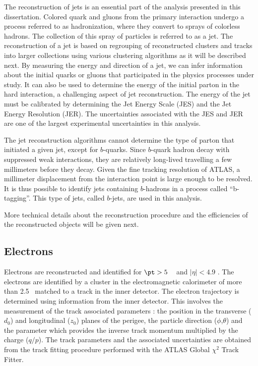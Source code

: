The reconstruction of jets is an essential part of the analysis presented in this dissertation. 
Colored quark and gluons from the primary interaction  undergo a process referred to as hadronization,
where they convert to sprays of colorless hadrons. The collection of this spray of particles is 
referred to as a jet. 
The reconstruction of a jet is based on regrouping of reconstructed clusters and tracks into larger collections using
various clustering algorithms as it will be described next.
By measuring the energy and direction of a jet, we can infer information 
about the initial quarks or gluons that participated in the physics processes under study.
It can also be used to determine the energy of the initial parton in the hard interaction, 
a challenging aspect of jet reconstruction.
The energy of the jet must be calibrated by determining the 
Jet Energy Scale (JES) and the Jet Energy Resolution (JER).%
The uncertainties associated with the JES and JER are one of the largest 
experimental uncertainties in this analysis.

The jet reconstruction algorithms cannot determine the type of parton that initiated a
given jet, except for $b$-quarks.
Since $b$-quark hadron decay with suppressed weak interactions, they are 
relatively long-lived travelling a few millimeters before they decay.
Given the fine tracking resolution of ATLAS, 
a millimeter displacement from the interaction point is large enough to be resolved.
It is thus possible to identify jets containing $b$-hadrons  in a process called ``b-tagging''.
This type of jets, called $b$-jets, are used in this analysis.

More technical details about the reconstruction procedure and the efficiencies 
of the reconstructed objects will be given next.

\subsection{Electrons}
Electrons are reconstructed and identified for $\pt > 5$ \GeV~ and
 $|\eta| < 4.9$ \cite{ATLAS-CONF-2016-024}.
The electrons  are identified by a cluster in the electromagnetic calorimeter of more than 2.5 \GeV~matched to a track in the inner detector.
The electron trajectory is determined using information from the inner detector. This involves the measurement of the track associated parameters : the
position in the transverse ($d_0$) and longitudinal ($z_0$) planes of the perigee, the particle direction ($\phi$,$\theta$)
and the parameter which provides the inverse track momentum multiplied by the charge ($q/p$). The track
parameters and the associated uncertainties are obtained from the track fitting procedure performed with
the ATLAS Global $\chi^2$ Track Fitter.

